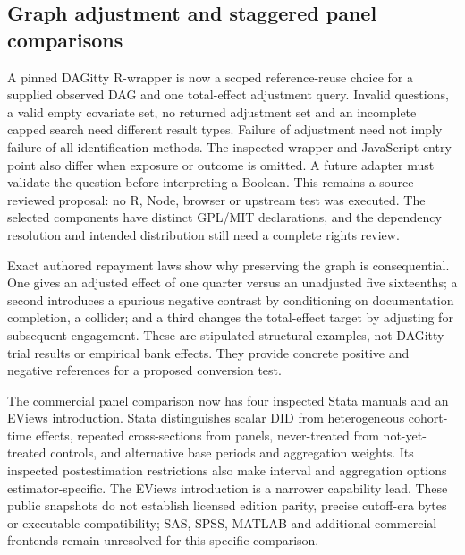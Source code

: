 \hypertarget{graph-adjustment-and-staggered-panel-comparisons}{%
\subsection{Graph adjustment and staggered panel
comparisons}\label{graph-adjustment-and-staggered-panel-comparisons}}

A pinned DAGitty R-wrapper is now a scoped reference-reuse choice for a
supplied observed DAG and one total-effect adjustment query. Invalid
questions, a valid empty covariate set, no returned adjustment set and
an incomplete capped search need different result types. Failure of
adjustment need not imply failure of all identification methods. The
inspected wrapper and JavaScript entry point also differ when exposure
or outcome is omitted. A future adapter must validate the question
before interpreting a Boolean. This remains a source-reviewed proposal:
no R, Node, browser or upstream test was executed. The selected
components have distinct GPL/MIT declarations, and the dependency
resolution and intended distribution still need a complete rights
review. \citep{exec18_gp_dagitty}

Exact authored repayment laws show why preserving the graph is
consequential. One gives an adjusted effect of one quarter versus an
unadjusted five sixteenths; a second introduces a spurious negative
contrast by conditioning on documentation completion, a collider; and a
third changes the total-effect target by adjusting for subsequent
engagement. These are stipulated structural examples, not DAGitty trial
results or empirical bank effects. They provide concrete positive and
negative references for a proposed conversion test.
\citep{exec18_gp_graph_reference}

The commercial panel comparison now has four inspected Stata manuals and
an EViews introduction. Stata distinguishes scalar DID from
heterogeneous cohort-time effects, repeated cross-sections from panels,
never-treated from not-yet-treated controls, and alternative base
periods and aggregation weights. Its inspected postestimation
restrictions also make interval and aggregation options
estimator-specific. The EViews introduction is a narrower capability
lead. These public snapshots do not establish licensed edition parity,
precise cutoff-era bytes or executable compatibility; SAS, SPSS, MATLAB
and additional commercial frontends remain unresolved for this specific
comparison.
\citep{exec18_gp_stata_did,exec18_gp_stata_hdid,exec18_gp_stata_xthdid,
exec18_gp_stata_post,exec18_gp_eviews}

